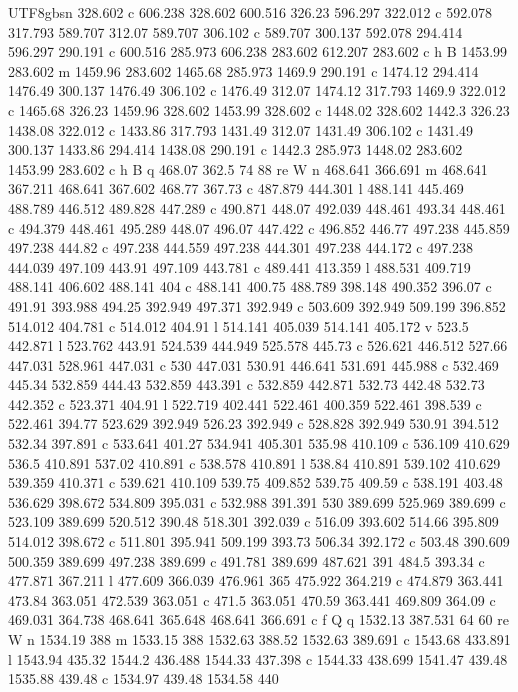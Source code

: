 \documentclass[11pt,a4paper,oneside]{report}
\begin{document}
\begin{CJK*}{UTF8}{gbsn}
{328.602 c 606.238 328.602 600.516 326.23 596.297 322.012 c 592.078 317.793 589.707 312.07 589.707 306.102
c 589.707 300.137 592.078 294.414 596.297 290.191 c 600.516 285.973 606.238 283.602 612.207 283.602 c h B
1453.99 283.602 m 1459.96 283.602 1465.68 285.973 1469.9 290.191 c 1474.12 294.414 1476.49 300.137
1476.49 306.102 c 1476.49 312.07 1474.12 317.793 1469.9 322.012 c 1465.68 326.23 1459.96 328.602 1453.99
328.602 c 1448.02 328.602 1442.3 326.23 1438.08 322.012 c 1433.86 317.793 1431.49 312.07 1431.49 306.102
c 1431.49 300.137 1433.86 294.414 1438.08 290.191 c 1442.3 285.973 1448.02 283.602 1453.99 283.602 c h B
q 468.07 362.5 74 88 re W n 468.641 366.691 m 468.641 367.211 468.641 367.602 468.77 367.73 c 487.879
444.301 l 488.141 445.469 488.789 446.512 489.828 447.289 c 490.871 448.07 492.039 448.461 493.34 448.461
c 494.379 448.461 495.289 448.07 496.07 447.422 c 496.852 446.77 497.238 445.859 497.238 444.82 c 497.238
444.559 497.238 444.301 497.238 444.172 c 497.238 444.039 497.109 443.91 497.109 443.781 c 489.441
413.359 l 488.531 409.719 488.141 406.602 488.141 404 c 488.141 400.75 488.789 398.148 490.352 396.07 c
491.91 393.988 494.25 392.949 497.371 392.949 c 503.609 392.949 509.199 396.852 514.012 404.781 c 514.012
404.91 l 514.141 405.039 514.141 405.172 v 523.5 442.871 l 523.762 443.91 524.539 444.949 525.578 445.73
c 526.621 446.512 527.66 447.031 528.961 447.031 c 530 447.031 530.91 446.641 531.691 445.988 c 532.469
445.34 532.859 444.43 532.859 443.391 c 532.859 442.871 532.73 442.48 532.73 442.352 c 523.371 404.91 l
522.719 402.441 522.461 400.359 522.461 398.539 c 522.461 394.77 523.629 392.949 526.23 392.949 c 528.828
392.949 530.91 394.512 532.34 397.891 c 533.641 401.27 534.941 405.301 535.98 410.109 c 536.109 410.629
536.5 410.891 537.02 410.891 c 538.578 410.891 l 538.84 410.891 539.102 410.629 539.359 410.371 c 539.621
410.109 539.75 409.852 539.75 409.59 c 538.191 403.48 536.629 398.672 534.809 395.031 c 532.988 391.391
530 389.699 525.969 389.699 c 523.109 389.699 520.512 390.48 518.301 392.039 c 516.09 393.602 514.66
395.809 514.012 398.672 c 511.801 395.941 509.199 393.73 506.34 392.172 c 503.48 390.609 500.359 389.699
497.238 389.699 c 491.781 389.699 487.621 391 484.5 393.34 c 477.871 367.211 l 477.609 366.039 476.961
365 475.922 364.219 c 474.879 363.441 473.84 363.051 472.539 363.051 c 471.5 363.051 470.59 363.441
469.809 364.09 c 469.031 364.738 468.641 365.648 468.641 366.691 c f Q q 1532.13 387.531 64 60 re W n
1534.19 388 m 1533.15 388 1532.63 388.52 1532.63 389.691 c 1543.68 433.891 l 1543.94 435.32 1544.2
436.488 1544.33 437.398 c 1544.33 438.699 1541.47 439.48 1535.88 439.48 c 1534.97 439.48 1534.58 440
}
\end{CJK*}
\end{document}
